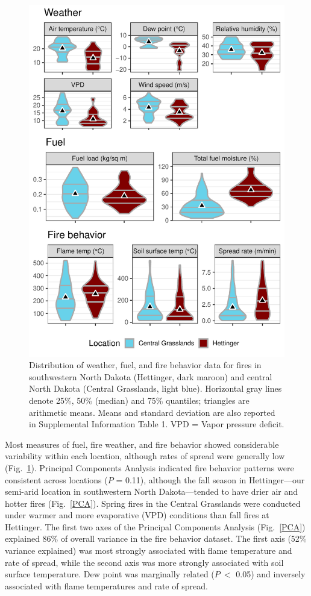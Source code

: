\documentclass[referee, 
		     sn-basic]{sn-jnl}
\begin{document}
\begin{linenumbers}
\begin{figure}[!h]
\includegraphics[width = 1\columnwidth]{data_summary_gg-1.pdf}
\caption{Distribution of weather, fuel, and fire behavior data for fires in southwestern North Dakota (Hettinger, dark maroon) and central North Dakota (Central Grasslands, light blue). 
Horizontal gray lines denote 25\%, 50\% (median) and 75\% quantiles; triangles are arithmetic means. 
Means and standard deviation are also reported in Supplemental Information Table 1. 
VPD = Vapor pressure deficit.}
\label{DataSummary}
\end{figure}

Most measures of fuel, fire weather, and fire behavior showed considerable variability within each location, although rates of spread were generally low (Fig.~\ref{DataSummary}). 
Principal Components Analysis indicated fire behavior patterns were consistent across locations ($P$ = 0.11), although the fall season in Hettinger---our semi-arid location in southwestern North Dakota---tended to have drier air and hotter fires (Fig.~\ref{PCA}). 
Spring fires in the Central Grasslands were conducted under warmer and more evaporative (VPD) conditions than fall fires at Hettinger. 
The first two axes of the Principal Components Analysis (Fig.~\ref{PCA}) explained 86\% of overall variance in the fire behavior dataset. 
The first axis (52\% variance explained) was most strongly associated with flame temperature and rate of spread, while the second axis was more strongly associated with soil surface temperature. 
Dew point was marginally related ($P~<$ 0.05) and inversely associated with flame temperatures and rate of spread.


\end{linenumbers}
\end{document}
